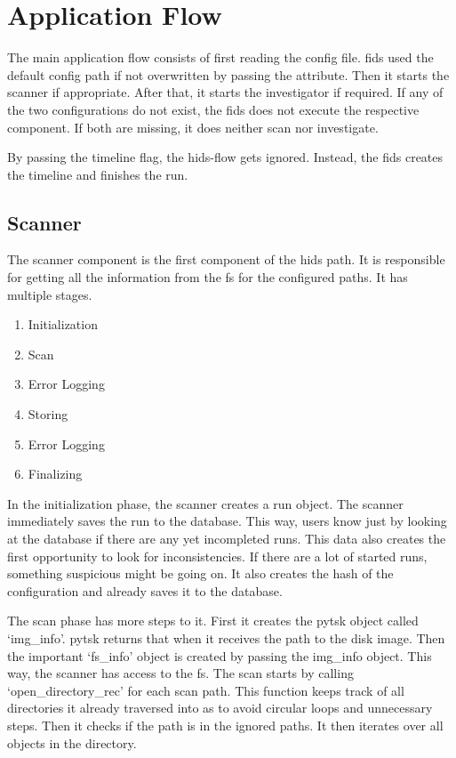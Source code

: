 
\section{Application Flow}
\label{sec:flow}

The main application flow consists of first reading the config file. \gls{fids} used the default config path if not overwritten by passing the attribute. Then it starts the scanner if appropriate. After that, it starts the investigator if required. If any of the two configurations do not exist, the \gls{fids} does not execute the respective component. If both are missing, it does neither scan nor investigate.

By passing the timeline flag, the \gls{hids}-flow gets ignored. Instead, the \gls{fids} creates the timeline and finishes the run.

\subsection{Scanner}
\label{sec:Scanner}

The scanner component is the first component of the \gls{hids} path. It is responsible for getting all the information from the \gls{fs} for the configured paths. It has multiple stages.

\begin{enumerate}
    \item Initialization
    \item Scan
    \item Error Logging
    \item Storing
    \item Error Logging
    \item Finalizing
\end{enumerate}

In the initialization phase, the scanner creates a run object. The scanner immediately saves the run to the database. This way, users know just by looking at the database if there are any yet incompleted runs. This data also creates the first opportunity to look for inconsistencies. If there are a lot of started runs, something suspicious might be going on. It also creates the hash of the configuration and already saves it to the database.

The scan phase has more steps to it. First it creates the \gls{pytsk} object called `img\_info'. \Gls{pytsk} returns that when it receives the path to the disk image. Then the important `fs\_info' object is created by passing the img\_info object. This way, the scanner has access to the \gls{fs}. The scan starts by calling `open\_directory\_rec' for each scan path. This function keeps track of all directories it already traversed into as to avoid circular loops and unnecessary steps. Then it checks if the path is in the ignored paths. It then iterates over all objects in the directory.

